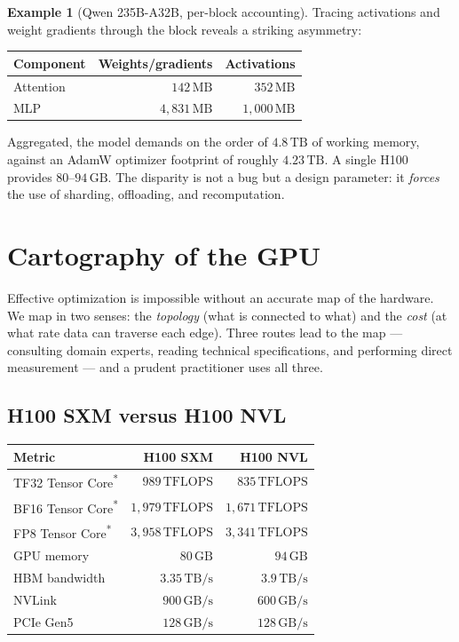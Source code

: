 \documentclass[11pt,a4paper]{article}
\theoremstyle{definition}
\newtheorem{example}[definition]{Example}
\theoremstyle{remark}
\theoremstyle{plain}
\newcommand{\GB}{\,\text{GB}}
\newcommand{\MB}{\,\text{MB}}
\newcommand{\TB}{\,\text{TB}}
\newcommand{\TFLOPS}{\,\text{TFLOPS}}
\begin{document}
\begin{example}[Qwen 235B-A32B, per-block accounting]
Tracing activations and weight gradients through the block reveals a striking asymmetry:
\begin{center}
\begin{tabular}{lrr}
\toprule
Component & Weights/gradients & Activations \\
\midrule
Attention     & $142 \MB$        & $352 \MB$ \\
MLP           & $4{,}831 \MB$    & $1{,}000 \MB$ \\
\bottomrule
\end{tabular}
\end{center}
Aggregated, the model demands on the order of $4.8\TB$ of working memory, against an AdamW optimizer footprint of roughly $4.23\TB$. A single H100 provides $80$--$94\GB$. The disparity is not a bug but a design parameter: it \emph{forces} the use of sharding, offloading, and recomputation.
\end{example}

\section{Cartography of the GPU}
\label{sec:gpu}


Effective optimization is impossible without an accurate map of the hardware. We map in two senses: the \emph{topology} (what is connected to what) and the \emph{cost} (at what rate data can traverse each edge). Three routes lead to the map --- consulting domain experts, reading technical specifications, and performing direct measurement --- and a prudent practitioner uses all three.

\subsection{H100 SXM versus H100 NVL}

\begin{center}
\begin{tabular}{lrr}
\toprule
Metric & H100 SXM & H100 NVL \\
\midrule
TF32 Tensor Core\textsuperscript{*}    & $989\TFLOPS$   & $835\TFLOPS$ \\
BF16 Tensor Core\textsuperscript{*}    & $1{,}979\TFLOPS$ & $1{,}671\TFLOPS$ \\
FP8  Tensor Core\textsuperscript{*}    & $3{,}958\TFLOPS$ & $3{,}341\TFLOPS$ \\
GPU memory                             & $80\GB$   & $94\GB$ \\
HBM bandwidth                          & $3.35\TB/\text{s}$ & $3.9\TB/\text{s}$ \\
NVLink                                 & $900\GB/\text{s}$  & $600\GB/\text{s}$ \\
PCIe Gen5                              & $128\GB/\text{s}$  & $128\GB/\text{s}$ \\
\bottomrule
\end{tabular}
\end{center}
\end{document}
